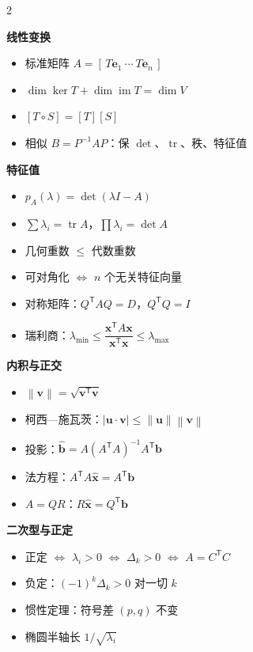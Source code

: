 \documentclass[11pt,a4paper,openany]{ctexbook}
\DeclareMathOperator{\tr}{tr}
\newcommand{\norm}[1]{\left\lVert #1 \right\rVert}
\newcommand{\abs}[1]{\left\lvert #1 \right\rvert}
\newcommand{\minihead}[1]{%
  \par\addvspace{8pt}%
  {\noindent\sffamily\bfseries\large\color{qing} #1\par}%
  \vspace{-4pt}\noindent{\color{qing!28}\rule{\linewidth}{0.6pt}}\par\vspace{5pt}}
\begin{document}
\begin{multicols}{2}
\minihead{线性变换}
\begin{itemize}[leftmargin=1.4em, itemsep=2pt]
\item 标准矩阵 $A=[\,T\boldsymbol{e}_1\ \cdots\ T\boldsymbol{e}_n\,]$
\item $\dim\ker T+\dim\operatorname{im}T=\dim V$
\item $[T\circ S]=[T][S]$
\item 相似 $B=P^{-1}AP$：保 $\det$、$\tr$、秩、特征值
\end{itemize}

\minihead{特征值}
\begin{itemize}[leftmargin=1.4em, itemsep=2pt]
\item $p_A(\lambda)=\det(\lambda I-A)$
\item $\sum\lambda_i=\tr A$，$\prod\lambda_i=\det A$
\item 几何重数 $\le$ 代数重数
\item 可对角化 $\Leftrightarrow$ $n$ 个无关特征向量
\item 对称矩阵：$Q^{\mathsf T}AQ=D$，$Q^{\mathsf T}Q=I$
\item 瑞利商：$\lambda_{\min}\le\dfrac{\boldsymbol{x}^{\mathsf T}A\boldsymbol{x}}
      {\boldsymbol{x}^{\mathsf T}\boldsymbol{x}}\le\lambda_{\max}$
\end{itemize}

\minihead{内积与正交}
\begin{itemize}[leftmargin=1.4em, itemsep=2pt]
\item $\norm{\boldsymbol{v}}=\sqrt{\boldsymbol{v}^{\mathsf T}\boldsymbol{v}}$
\item 柯西—施瓦茨：$\abs{\boldsymbol{u}\cdot\boldsymbol{v}}
      \le\norm{\boldsymbol{u}}\norm{\boldsymbol{v}}$
\item 投影：$\widehat{\boldsymbol{b}}=A(A^{\mathsf T}A)^{-1}A^{\mathsf T}\boldsymbol{b}$
\item 法方程：$A^{\mathsf T}A\widehat{\boldsymbol{x}}=A^{\mathsf T}\boldsymbol{b}$
\item $A=QR$：$R\widehat{\boldsymbol{x}}=Q^{\mathsf T}\boldsymbol{b}$
\end{itemize}

\minihead{二次型与正定}
\begin{itemize}[leftmargin=1.4em, itemsep=2pt]
\item 正定 $\Leftrightarrow$ $\lambda_i>0$ $\Leftrightarrow$ $\Delta_k>0$
      $\Leftrightarrow$ $A=C^{\mathsf T}C$
\item 负定：$(-1)^k\Delta_k>0$ 对一切 $k$
\item 惯性定理：符号差 $(p,q)$ 不变
\item 椭圆半轴长 $1/\sqrt{\lambda_i}$
\end{itemize}


\end{multicols}
\end{document}
